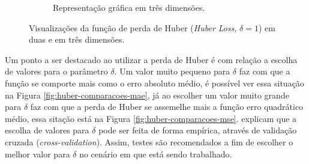 \begin{figure}[h!]
\begin{subfigure}[b]{0.48\textwidth}
        \caption{Representação gráfica em três dimensões.} %
        \label{fig:huber-3d}
    \end{subfigure}

    \caption{Visualizações da função de perda de Huber (\textit{Huber Loss}, $\delta=1$) em duas e em três dimensões.}
    \label{fig:huber-loss} %
\end{figure}

Um ponto a ser destacado ao utilizar a perda de Huber é com relação a escolha de valores para o parâmetro $\delta$. Um valor muito pequeno para $\delta$ faz com que a função se comporte mais como o erro absoluto médio, é possível ver essa situação na Figura \ref{fig:huber-comparacoes-mae}, já ao escolher um valor muito grande para $\delta$ faz com que a perda de Huber se assemelhe mais a função erro quadrático médio, essa sitação está na Figura \ref{fig:huber-comparacoes-mse}. \textcite{LossesArticle} explicam que a escolha de valores para $\delta$ pode ser feita de forma empírica, através de validação cruzada (\textit{cross-validation}). Assim, testes são recomendados a fim de escolher o melhor valor para $\delta$ no cenário em que está sendo trabalhado.

